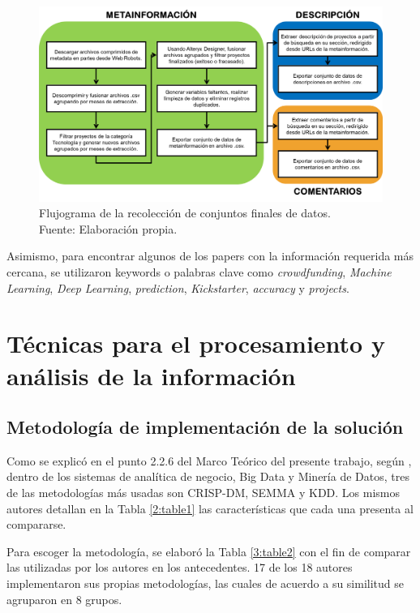 \begin{figure}[h]
	\begin{center}
		\includegraphics[width=1\textwidth]{3/figures/data_recolection_flux.png}
		\caption[Flujograma de la recolección de conjuntos finales de datos]{Flujograma de la recolección de conjuntos finales de datos.\\
			Fuente: Elaboración propia.}
		\label{3:fig1}
	\end{center}
\end{figure}

Asimismo, para encontrar algunos de los papers con la información requerida más cercana, se utilizaron keywords o palabras clave como \textit{crowdfunding}, \textit{Machine Learning}, \textit{Deep Learning}, \textit{prediction}, \textit{Kickstarter}, \textit{accuracy} y \textit{projects}.

\section{Técnicas para el procesamiento y análisis de la información}

\subsection{Metodología de implementación de la solución}
Como se explicó en el punto 2.2.6 del Marco Teórico del presente trabajo, según \cite{tec_braulio2015metodologiasdm}, dentro de los sistemas de analítica de negocio, Big Data y Minería de Datos, tres de las metodologías más usadas son CRISP-DM, SEMMA y KDD. Los mismos autores detallan en la Tabla \ref{2:table1} las características que cada una presenta al compararse.

Para escoger la metodología, se elaboró la Tabla \ref{3:table2} con el fin de comparar las utilizadas por los autores en los antecedentes. 17 de los 18 autores implementaron sus propias metodologías, las cuales de acuerdo a su similitud se agruparon en 8 grupos.

